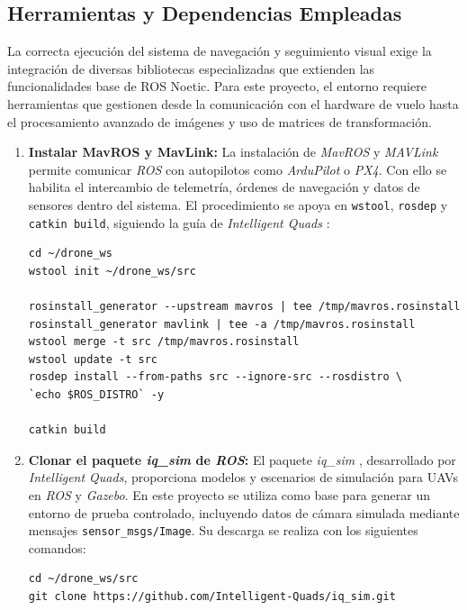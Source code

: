 \subsection{Herramientas y Dependencias Empleadas}


La correcta ejecución del sistema de navegación y seguimiento visual exige la integración de diversas bibliotecas especializadas que extienden las funcionalidades base de ROS Noetic. Para este proyecto, el entorno requiere herramientas que gestionen desde la comunicación con el hardware de vuelo hasta el procesamiento avanzado de imágenes y uso de matrices de transformación.


\begin{enumerate}


\item \textbf{Instalar MavROS y MavLink:}
La instalación de \textit{MavROS} y \textit{MAVLink} permite comunicar \textit{ROS} con autopilotos como \textit{ArduPilot} o \textit{PX4}. Con ello se habilita el intercambio de telemetría, órdenes de navegación y datos de sensores dentro del sistema. El procedimiento se apoya en \texttt{wstool}, \texttt{rosdep} y \texttt{catkin build}, siguiendo la guía de \textit{Intelligent Quads} \cite{iqtutorialsros2004}:

\begin{verbatim}
cd ~/drone_ws
wstool init ~/drone_ws/src

rosinstall_generator --upstream mavros | tee /tmp/mavros.rosinstall
rosinstall_generator mavlink | tee -a /tmp/mavros.rosinstall
wstool merge -t src /tmp/mavros.rosinstall
wstool update -t src
rosdep install --from-paths src --ignore-src --rosdistro \ 
`echo $ROS_DISTRO` -y

catkin build
\end{verbatim}


\item \textbf{Clonar el paquete \textit{iq\_sim} de \textit{ROS}:}
El paquete \textit{iq\_sim} \cite{iqsim}, desarrollado por \textit{Intelligent Quads}, proporciona modelos y escenarios de simulación para UAVs en \textit{ROS} y \textit{Gazebo}. En este proyecto se utiliza como base para generar un entorno de prueba controlado, incluyendo datos de cámara simulada mediante mensajes \verb|sensor_msgs/Image|. Su descarga se realiza con los siguientes comandos:
\begin{verbatim}
cd ~/drone_ws/src
git clone https://github.com/Intelligent-Quads/iq_sim.git
\end{verbatim}


\end{enumerate}

